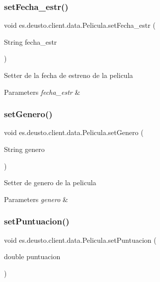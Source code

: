 \subsubsection{\texorpdfstring{setFecha\_estr()}{setFecha\_estr()}}
{\footnotesize\ttfamily void es.\+deusto.\+client.\+data.\+Pelicula.\+set\+Fecha\+\_\+estr (\begin{DoxyParamCaption}\item[{String}]{fecha\+\_\+estr }\end{DoxyParamCaption})}

Setter de la fecha de estreno de la pelicula 
\begin{DoxyParams}{Parameters}
{\em fecha\+\_\+estr} & \\
\hline
\end{DoxyParams}
\mbox{\label{classes_1_1deusto_1_1client_1_1data_1_1_pelicula_aa5af2ff51200f68ea9554b072fcabb15}} 
\subsubsection{\texorpdfstring{setGenero()}{setGenero()}}
{\footnotesize\ttfamily void es.\+deusto.\+client.\+data.\+Pelicula.\+set\+Genero (\begin{DoxyParamCaption}\item[{String}]{genero }\end{DoxyParamCaption})}

Setter de genero de la pelicula 
\begin{DoxyParams}{Parameters}
{\em genero} & \\
\hline
\end{DoxyParams}
\mbox{\label{classes_1_1deusto_1_1client_1_1data_1_1_pelicula_ab4e026bb1ed2ac2ca5a345e4fa3c4d11}} 
\subsubsection{\texorpdfstring{setPuntuacion()}{setPuntuacion()}}
{\footnotesize\ttfamily void es.\+deusto.\+client.\+data.\+Pelicula.\+set\+Puntuacion (\begin{DoxyParamCaption}\item[{double}]{puntuacion }\end{DoxyParamCaption})}

